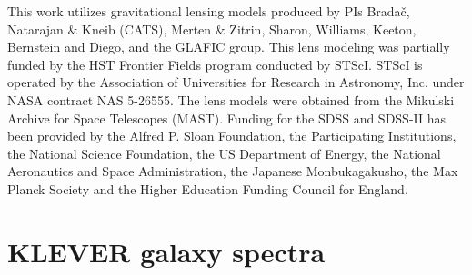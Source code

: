 \documentclass[usenatbib]{mnras} %
\begin{document}
This work utilizes gravitational lensing models produced by PIs Bradač, Natarajan \& Kneib (CATS), Merten \& Zitrin, Sharon, Williams, Keeton, Bernstein and Diego, and the GLAFIC group. This lens modeling was partially funded by the HST Frontier Fields program conducted by STScI. STScI is operated by the Association of Universities for Research in Astronomy, Inc. under NASA contract NAS 5-26555. The lens models were obtained from the Mikulski Archive for Space Telescopes (MAST). Funding for the SDSS and SDSS-II has been provided by the Alfred P. Sloan Foundation, the Participating Institutions, the National Science Foundation, the US Department of Energy, the National Aeronautics and Space Administration, the Japanese Monbukagakusho, the Max Planck Society and the Higher Education Funding Council for England.










\appendix



\section{KLEVER galaxy spectra}
\label{sec:KLEVER_spec}
\end{document}
